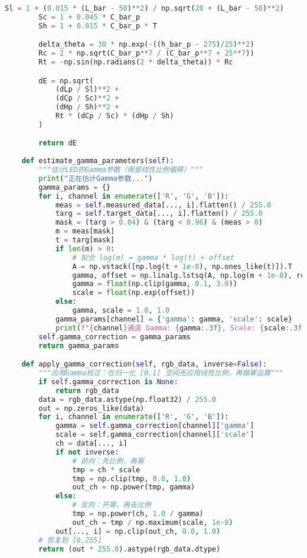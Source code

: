 \begin{lstlisting}[language=Python]
        Sl = 1 + (0.015 * (L_bar - 50)**2) / np.sqrt(20 + (L_bar - 50)**2)
        Sc = 1 + 0.045 * C_bar_p
        Sh = 1 + 0.015 * C_bar_p * T

        delta_theta = 30 * np.exp(-((h_bar_p - 275)/25)**2)
        Rc = 2 * np.sqrt(C_bar_p**7 / (C_bar_p**7 + 25**7))
        Rt = -np.sin(np.radians(2 * delta_theta)) * Rc

        dE = np.sqrt(
            (dLp / Sl)**2 +
            (dCp / Sc)**2 +
            (dHp / Sh)**2 +
            Rt * (dCp / Sc) * (dHp / Sh)
        )

        return dE
    
    def estimate_gamma_parameters(self):
        """估计LED的Gamma参数（保留线性比例偏移）"""
        print("正在估计Gamma参数...")
        gamma_params = {}
        for i, channel in enumerate(['R', 'G', 'B']):
            meas = self.measured_data[..., i].flatten() / 255.0
            targ = self.target_data[..., i].flatten() / 255.0
            mask = (targ > 0.04) & (targ < 0.96) & (meas > 0)
            m = meas[mask]
            t = targ[mask]
            if len(m) > 0:
                # 拟合 log(m) = gamma * log(t) + offset
                A = np.vstack([np.log(t + 1e-8), np.ones_like(t)]).T
                gamma, offset = np.linalg.lstsq(A, np.log(m + 1e-8), rcond=None)[0]
                gamma = float(np.clip(gamma, 0.1, 3.0))
                scale = float(np.exp(offset))
            else:
                gamma, scale = 1.0, 1.0
            gamma_params[channel] = {'gamma': gamma, 'scale': scale}
            print(f"{channel}通道 Gamma: {gamma:.3f}, Scale: {scale:.3f}")
        self.gamma_correction = gamma_params
        return gamma_params

    def apply_gamma_correction(self, rgb_data, inverse=False):
        """应用Gamma校正：在归一化 [0,1] 空间先应用线性比例，再做幂运算"""
        if self.gamma_correction is None:
            return rgb_data
        data = rgb_data.astype(np.float32) / 255.0
        out = np.zeros_like(data)
        for i, channel in enumerate(['R', 'G', 'B']):
            gamma = self.gamma_correction[channel]['gamma']
            scale = self.gamma_correction[channel]['scale']
            ch = data[..., i]
            if not inverse:
                # 前向：先比例，再幂
                tmp = ch * scale
                tmp = np.clip(tmp, 0.0, 1.0)
                out_ch = np.power(tmp, gamma)
            else:
                # 反向：开幂，再去比例
                tmp = np.power(ch, 1.0 / gamma)
                out_ch = tmp / np.maximum(scale, 1e-8)
            out[..., i] = np.clip(out_ch, 0.0, 1.0)
        # 恢复到 [0,255]
        return (out * 255.0).astype(rgb_data.dtype)
    

\end{lstlisting}
